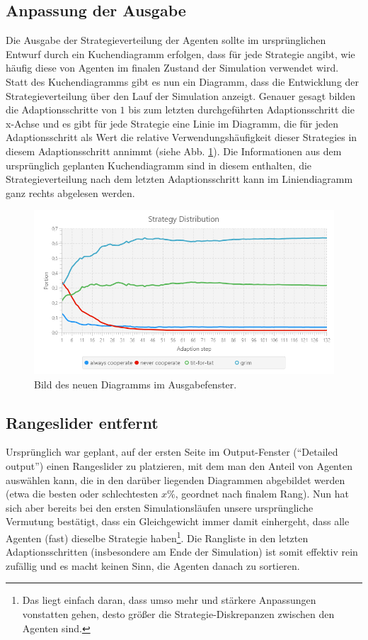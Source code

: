 \documentclass[parskip=full,11pt]{scrartcl}
\begin{document}
\subsection{Anpassung der Ausgabe}\label{outputmod}
Die Ausgabe der Strategieverteilung der Agenten sollte im ursprünglichen Entwurf durch ein Kuchendiagramm erfolgen, dass für jede Strategie angibt, wie häufig diese von Agenten im finalen Zustand der Simulation verwendet wird. Statt des Kuchendiagramms gibt es nun ein Diagramm, dass die Entwicklung der Strategieverteilung über den Lauf der Simulation anzeigt. Genauer gesagt bilden die Adaptionsschritte von \(1\) bis zum letzten durchgeführten Adaptionsschritt die x-Achse und es gibt für jede Strategie eine Linie im Diagramm, die für jeden Adaptionsschritt als Wert die relative Verwendungshäufigkeit dieser Strategies in diesem Adaptionsschritt annimmt (siehe Abb. \ref{fig:newoutput}). Die Informationen aus dem ursprünglich geplanten Kuchendiagramm sind in diesem enthalten, die Strategieverteilung nach dem letzten Adaptionsschritt kann im Liniendiagramm ganz rechts abgelesen werden.

\begin{figure}[h]
	\centering
	\includegraphics[width=\linewidth]{img/newoutput.png}
	\caption{Bild des neuen Diagramms im Ausgabefenster.}
	\label{fig:newoutput}
\end{figure}

\subsection{Rangeslider entfernt}
Ursprünglich war geplant, auf der ersten Seite im Output-Fenster (\enquote{Detailed output}) einen Rangeslider zu platzieren, mit dem man den Anteil von Agenten auswählen kann, die in den darüber liegenden Diagrammen abgebildet werden (etwa die besten oder schlechtesten \(x\%\), geordnet nach finalem Rang). Nun hat sich aber bereits bei den ersten Simulationsläufen unsere ursprüngliche Vermutung bestätigt, dass ein Gleichgewicht immer damit einhergeht, dass alle Agenten (fast) dieselbe Strategie haben\footnote{Das liegt einfach daran, dass umso mehr und stärkere Anpassungen vonstatten gehen, desto größer die Strategie-Diskrepanzen zwischen den Agenten sind.}. Die Rangliste in den letzten Adaptionsschritten (insbesondere am Ende der Simulation) ist somit effektiv rein zufällig und es macht keinen Sinn, die Agenten danach zu sortieren.
\end{document}
